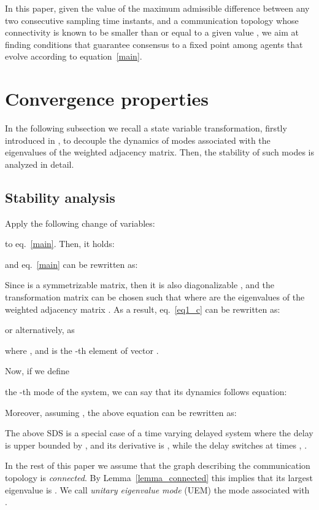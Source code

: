 \documentclass[conference]{IEEEtran}
\begin{document}
In this paper, given the value of the maximum admissible difference  between any two consecutive sampling time instants, and a communication topology whose connectivity is known to be smaller than or equal to a given value , we aim at finding conditions that guarantee consensus to a fixed point among agents that evolve according to equation~\eqref{main}.


\section{Convergence properties}\label{main_res_1}

In the following subsection we recall a state variable transformation, firstly introduced in \cite{ETFA2014}, to decouple the dynamics of modes associated with the eigenvalues of the weighted adjacency matrix. Then, the stability of such modes is analyzed in detail.

\subsection{Stability analysis}

Apply the following change of variables:

to eq.~\eqref{main}. Then, it holds:

and eq.~\eqref{main} can be rewritten as:

Since  is a symmetrizable matrix, then it is also diagonalizable \cite{cepeda2011exact}, and the transformation matrix  can be chosen such that  where  are the eigenvalues of the weighted adjacency matrix .
As a result, eq.~\eqref{eq1_c} can be rewritten as:

or alternatively, as

where , and  is the -th element of vector .

Now, if we define

the -th {mode} of the system, we can say that its dynamics follows equation:


Moreover, assuming , the above equation can be rewritten as:

The above SDS is a special case of a time varying delayed system where the delay  is upper bounded by , and its derivative is , while the delay switches at times , .



In the rest of this paper we assume that the graph  describing the communication topology is {\em connected}. By Lemma~\ref{lemma_connected} this implies that its largest eigenvalue is . We call \emph{unitary eigenvalue mode} (UEM) the mode associated with .
\end{document}
